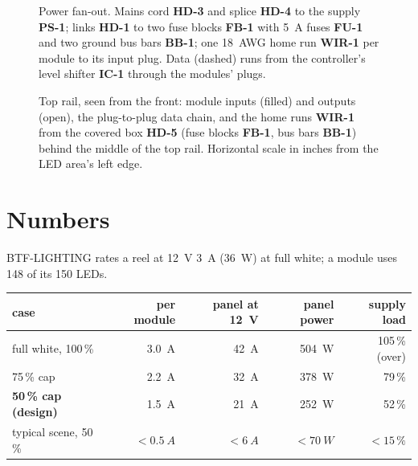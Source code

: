 \documentclass[11pt,letterpaper]{article}
\newcommand{\id}[1]{\textsf{\textbf{#1}}}  %
\begin{document}
\begin{figure}[!htbp]
  \centering
  
  \caption{Power fan-out.  Mains cord \id{HD-3} and splice \id{HD-4} to the supply \id{PS-1}; links \id{HD-1} to
    two fuse blocks \id{FB-1} with \SI{5}{A} fuses \id{FU-1} and two ground bus bars \id{BB-1}; one 18~AWG home
    run \id{WIR-1} per module to its input plug.  Data (dashed) runs from the controller's level shifter
    \id{IC-1} through the modules' plugs.}
  \label{fig:fanout}
\end{figure}

\begin{figure}[!htbp]
  \centering
  
  \caption{Top rail, seen from the front: module inputs (filled) and outputs (open), the plug-to-plug data chain,
    and the home runs \id{WIR-1} from the covered box \id{HD-5} (fuse blocks \id{FB-1}, bus bars \id{BB-1}) behind
    the middle of the top rail.  Horizontal scale in inches from the LED area's left edge.}
  \label{fig:runs}
\end{figure}

\section{Numbers}
\label{sec:numbers}

BTF-LIGHTING rates a reel at \SI{12}{V} \SI{3}{A} (\SI{36}{W}) at full white; a module uses 148 of its 150 LEDs.

\begin{center}
\begin{tabular}{@{}lrrrr@{}}
  \toprule
  case & per module & panel at \SI{12}{V} & panel power & supply load \\
  \midrule
  full white, 100\,\%     & \SI{3.0}{A} & \SI{42}{A} & \SI{504}{W} & 105\,\% (over) \\
  75\,\% cap              & \SI{2.2}{A} & \SI{32}{A} & \SI{378}{W} & 79\,\% \\
  \textbf{50\,\% cap (design)} & \SI{1.5}{A} & \SI{21}{A} & \SI{252}{W} & 52\,\% \\
  typical scene, 50\,\%   & $<\SI{0.5}{A}$ & $<\SI{6}{A}$ & $<\SI{70}{W}$ & $<15\,\%$ \\
  \bottomrule
\end{tabular}
\end{center}
\end{document}
